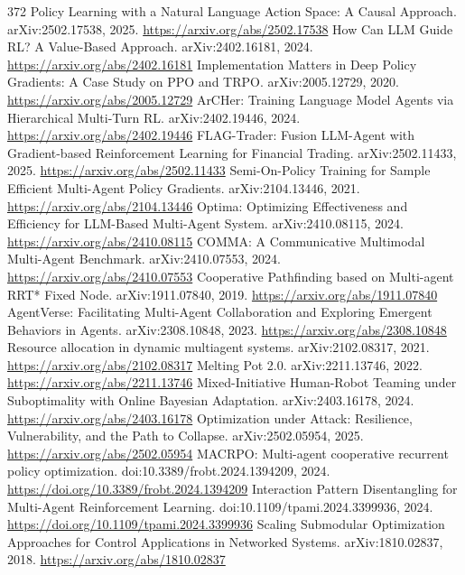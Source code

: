\documentclass[11pt]{article}
\begin{document}
\begin{thebibliography}{372}
 Policy Learning with a Natural Language Action Space: A Causal Approach. arXiv:2502.17538, 2025. \url{https://arxiv.org/abs/2502.17538}
 How Can LLM Guide RL? A Value-Based Approach. arXiv:2402.16181, 2024. \url{https://arxiv.org/abs/2402.16181}
 Implementation Matters in Deep Policy Gradients: A Case Study on PPO and TRPO. arXiv:2005.12729, 2020. \url{https://arxiv.org/abs/2005.12729}
 ArCHer: Training Language Model Agents via Hierarchical Multi-Turn RL. arXiv:2402.19446, 2024. \url{https://arxiv.org/abs/2402.19446}
 FLAG-Trader: Fusion LLM-Agent with Gradient-based Reinforcement Learning for Financial Trading. arXiv:2502.11433, 2025. \url{https://arxiv.org/abs/2502.11433}
 Semi-On-Policy Training for Sample Efficient Multi-Agent Policy Gradients. arXiv:2104.13446, 2021. \url{https://arxiv.org/abs/2104.13446}
 Optima: Optimizing Effectiveness and Efficiency for LLM-Based Multi-Agent System. arXiv:2410.08115, 2024. \url{https://arxiv.org/abs/2410.08115}
 COMMA: A Communicative Multimodal Multi-Agent Benchmark. arXiv:2410.07553, 2024. \url{https://arxiv.org/abs/2410.07553}
 Cooperative Pathfinding based on Multi-agent RRT* Fixed Node. arXiv:1911.07840, 2019. \url{https://arxiv.org/abs/1911.07840}
 AgentVerse: Facilitating Multi-Agent Collaboration and Exploring Emergent Behaviors in Agents. arXiv:2308.10848, 2023. \url{https://arxiv.org/abs/2308.10848}
 Resource allocation in dynamic multiagent systems. arXiv:2102.08317, 2021. \url{https://arxiv.org/abs/2102.08317}
 Melting Pot 2.0. arXiv:2211.13746, 2022. \url{https://arxiv.org/abs/2211.13746}
 Mixed-Initiative Human-Robot Teaming under Suboptimality with Online Bayesian Adaptation. arXiv:2403.16178, 2024. \url{https://arxiv.org/abs/2403.16178}
 Optimization under Attack: Resilience, Vulnerability, and the Path to Collapse. arXiv:2502.05954, 2025. \url{https://arxiv.org/abs/2502.05954}
 MACRPO: Multi-agent cooperative recurrent policy optimization. doi:10.3389/frobt.2024.1394209, 2024. \url{https://doi.org/10.3389/frobt.2024.1394209}
 Interaction Pattern Disentangling for Multi-Agent Reinforcement Learning. doi:10.1109/tpami.2024.3399936, 2024. \url{https://doi.org/10.1109/tpami.2024.3399936}
 Scaling Submodular Optimization Approaches for Control Applications in Networked Systems. arXiv:1810.02837, 2018. \url{https://arxiv.org/abs/1810.02837}

\end{thebibliography}
\end{document}
